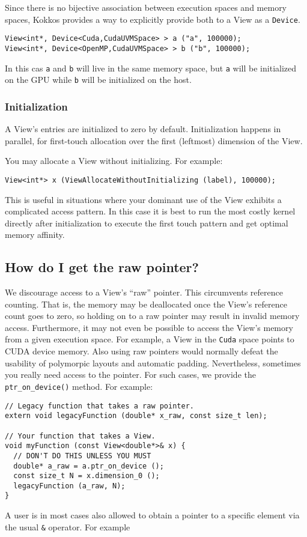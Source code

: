 Since there is no bijective association between execution spaces and memory 
spaces, Kokkos provides a way to explicitly provide both to a View as a 
\lstinline|Device|. 
\begin{lstlisting}
View<int*, Device<Cuda,CudaUVMSpace> > a ("a", 100000);
View<int*, Device<OpenMP,CudaUVMSpace> > b ("b", 100000);
\end{lstlisting}
In this cas \lstinline|a| and \lstinline|b| will live in the same memory space,
but \lstinline|a| will be initialized on the GPU while \lstinline|b| will be 
initialized on the host. 

\subsubsection{Initialization}

A View's entries are initialized to zero by default.  Initialization
happens in parallel, for first-touch allocation over the first
(leftmost) dimension of the View.

You may allocate a View without initializing.  For example:
\begin{lstlisting}
View<int*> x (ViewAllocateWithoutInitializing (label), 100000);
\end{lstlisting}
This is useful in situations where your dominant use of the View
exhibits a complicated access pattern. In this case it is best
to run the most costly kernel directly after initialization to 
execute the first touch pattern and get optimal memory affinity.

\subsection{How do I get the raw pointer?}

We discourage access to a View's ``raw'' pointer.  This circumvents
reference counting.  That is, the memory may be deallocated once the
View's reference count goes to zero, so holding on to a raw pointer
may result in invalid memory access.  Furthermore, it may not even be
possible to access the View's memory from a given execution space.
For example, a View in the \lstinline!Cuda! space points to CUDA device
memory. Also using raw pointers would normally defeat the usability 
of polymorpic layouts and automatic padding. 
Nevertheless, sometimes you really need access to the
pointer.  For such cases, we provide the \lstinline!ptr_on_device()!
method.  For example:
\begin{lstlisting}
// Legacy function that takes a raw pointer.
extern void legacyFunction (double* x_raw, const size_t len);

// Your function that takes a View.
void myFunction (const View<double*>& x) {
  // DON'T DO THIS UNLESS YOU MUST
  double* a_raw = a.ptr_on_device ();
  const size_t N = x.dimension_0 ();
  legacyFunction (a_raw, N);
}
\end{lstlisting}
A user is in most cases also allowed to obtain a pointer to a specific 
element via the usual \lstinline|&| operator. For example

